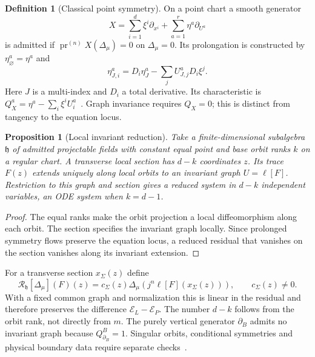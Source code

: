 \documentclass[12pt,a4paper,oneside]{report}
\numberwithin{equation}{chapter}
\newtheorem{proposition}[theorem]{Proposition}
\theoremstyle{definition}
\newtheorem{definition}[theorem]{Definition}
\theoremstyle{remark}\newtheorem{remark}[theorem]{Remark}
\newcommand{\pr}{\operatorname{pr}}
\newif\ifreviewmarks
\DeclareRobustCommand{\review}[1]{{\ifreviewmarks\color{authorblue}\fi #1}}
\begin{document}
\begin{definition}[Classical point symmetry]
On a point chart a smooth generator
\[
 X=\sum_{i=1}^d\xi^i\partial_{x^i}+\sum_{a=1}^r\eta^a\partial_{U^a}
\]
is admitted if $\pr^{(n)}X(\Delta_\mu)=0$ on $\Delta_\mu=0$. Its prolongation is constructed by $\eta^a_\varnothing=\eta^a$ and
\[
 \eta^a_{J,i}=D_i\eta^a_J-\sum_j U^a_{J,j}D_i\xi^j .
\]
Here $J$ is a multi-index and $D_i$ a total derivative. Its characteristic is $Q_X^a=\eta^a-\sum_i\xi^i U_i^a$~\cite[Chs.~2--3]{olver}. Graph invariance requires $Q_X=0$; this is distinct from tangency to the equation locus.
\end{definition}
\begin{proposition}[Local invariant reduction]\label{prop:regular-reduction}
\review{Take a finite-dimensional subalgebra $\mathfrak h$ of admitted projectable fields with constant equal point and base orbit ranks $k$ on a regular chart. A transverse local section has $d-k$ coordinates $z$. Its trace $F(z)$ extends uniquely along local orbits to an invariant graph $U=\ell[F]$. Restriction to this graph and section gives a reduced system in $d-k$ independent variables, an ODE system when $k=d-1$.}
\end{proposition}
\begin{proof}
\review{The equal ranks make the orbit projection a local diffeomorphism along each orbit. The section specifies the invariant graph locally. Since prolonged symmetry flows preserve the equation locus, a reduced residual that vanishes on the section vanishes along its invariant extension.}
\end{proof}

\review{For a transverse section $x_\Sigma(z)$ define}
\begin{equation}\label{eq:reduction-map}
 \review{\mathcal R_{\mathfrak h}[\Delta_\mu](F)(z)
 =c_\Sigma(z)\Delta_\mu(j^n\ell[F](x_\Sigma(z))),\qquad c_\Sigma(z)\ne0.}
\end{equation}
\review{With a fixed common graph and normalization this is linear in the residual and therefore preserves the difference $\mathcal E_L-\mathcal E_P$. The number $d-k$ follows from the orbit rank, not directly from $m$. The purely vertical generator $\partial_B$ admits no invariant graph because $Q^B_{\partial_B}=1$. Singular orbits, conditional symmetries and physical boundary data require separate checks~\cite{anderson2000}.}
\end{document}
